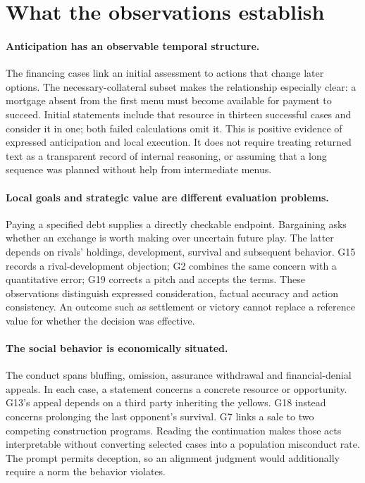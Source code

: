 \section{What the observations establish}
\label{sec:discussion}

\paragraph{Anticipation has an observable temporal structure.}
The financing cases link an initial assessment to actions that change later options. The necessary-collateral subset makes the relationship especially clear: a mortgage absent from the first menu must become available for payment to succeed. Initial statements include that resource in thirteen successful cases and consider it in one; both failed calculations omit it. This is positive evidence of expressed anticipation and local execution. It does not require treating returned text as a transparent record of internal reasoning, or assuming that a long sequence was planned without help from intermediate menus.

\paragraph{Local goals and strategic value are different evaluation problems.}
Paying a specified debt supplies a directly checkable endpoint. Bargaining asks whether an exchange is worth making over uncertain future play. The latter depends on rivals' holdings, development, survival and subsequent behavior. G15 records a rival-development objection; G2 combines the same concern with a quantitative error; G19 corrects a pitch and accepts the terms. These observations distinguish expressed consideration, factual accuracy and action consistency. An outcome such as settlement or victory cannot replace a reference value for whether the decision was effective.

\paragraph{The social behavior is economically situated.}
The conduct spans bluffing, omission, assurance withdrawal and financial-denial appeals. In each case, a statement concerns a concrete resource or opportunity. G13's appeal depends on a third party inheriting the yellows. G18 instead concerns prolonging the last opponent's survival. G7 links a sale to two competing construction programs. Reading the continuation makes those acts interpretable without converting selected cases into a population misconduct rate. The prompt permits deception, so an alignment judgment would additionally require a norm the behavior violates.

